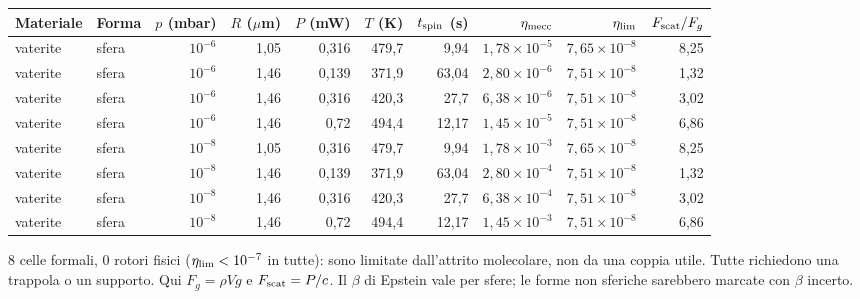 \begingroup\scriptsize\setlength{\tabcolsep}{1.2pt}
\begin{tabular}{@{}llrrrrrrrr@{}}
\hline
Materiale & Forma & $p$ (mbar) & $R$ ($\mu$m) & $P$ (mW) & $T$ (K) & $t_{\rm spin}$ (s) & $\eta_{\rm mecc}$ & $\eta_{\rm lim}$ & $F_{\rm scat}/F_g$ \\
\hline
vaterite & sfera & $10^{-6}$ & 1{,}05 & 0{,}316 & 479{,}7 & 9{,}94 & $1{,}78\times10^{-5}$ & $7{,}65\times10^{-8}$ & 8{,}25 \\
vaterite & sfera & $10^{-6}$ & 1{,}46 & 0{,}139 & 371{,}9 & 63{,}04 & $2{,}80\times10^{-6}$ & $7{,}51\times10^{-8}$ & 1{,}32 \\
vaterite & sfera & $10^{-6}$ & 1{,}46 & 0{,}316 & 420{,}3 & 27{,}7 & $6{,}38\times10^{-6}$ & $7{,}51\times10^{-8}$ & 3{,}02 \\
vaterite & sfera & $10^{-6}$ & 1{,}46 & 0{,}72 & 494{,}4 & 12{,}17 & $1{,}45\times10^{-5}$ & $7{,}51\times10^{-8}$ & 6{,}86 \\
\hline
vaterite & sfera & $10^{-8}$ & 1{,}05 & 0{,}316 & 479{,}7 & 9{,}94 & $1{,}78\times10^{-3}$ & $7{,}65\times10^{-8}$ & 8{,}25 \\
vaterite & sfera & $10^{-8}$ & 1{,}46 & 0{,}139 & 371{,}9 & 63{,}04 & $2{,}80\times10^{-4}$ & $7{,}51\times10^{-8}$ & 1{,}32 \\
vaterite & sfera & $10^{-8}$ & 1{,}46 & 0{,}316 & 420{,}3 & 27{,}7 & $6{,}38\times10^{-4}$ & $7{,}51\times10^{-8}$ & 3{,}02 \\
vaterite & sfera & $10^{-8}$ & 1{,}46 & 0{,}72 & 494{,}4 & 12{,}17 & $1{,}45\times10^{-3}$ & $7{,}51\times10^{-8}$ & 6{,}86 \\
\hline
\end{tabular}
\endgroup

\par\smallskip\noindent\footnotesize 8 celle formali, 0 rotori fisici ($\eta_{\rm lim}<10^{-7}$ in tutte): sono limitate dall'attrito molecolare, non da una coppia utile. Tutte richiedono una trappola o un supporto. Qui $F_g=\rho Vg$ e $F_{\rm scat}=P/c$. Il $\beta$ di Epstein vale per sfere; le forme non sferiche sarebbero marcate con $\beta$ incerto.
